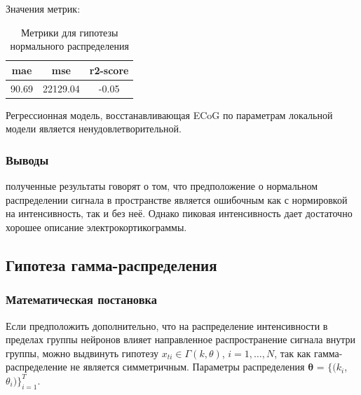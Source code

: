 \documentclass{mipt-thesis-bs}
\begin{document}
Значения метрик:
\begin{table}[h]
  
  \centering
    \begin{tabular}{ | c | c | c | }
	\hline
	mae & mse & r2-score \\ \hline
	90.69 & 22129.04 & -0.05 \\

	\hline
	\end{tabular}
\caption{Метрики для гипотезы нормального распределения}
\label{table:gauss mae}
\end{table}

Регрессионная модель, восстанавливающая ECoG по параметрам локальной модели является ненудовлетворительной.
\subsubsection{Выводы}
полученные результаты говорят о том, что предположение о нормальном распределении сигнала в пространстве является ошибочным как с нормировкой на интенсивность, так и без неё. Однако пиковая интенсивность дает достаточно хорошее описание электрокортикограммы. 
\subsection{Гипотеза гамма-распределения}

\subsubsection{Математическая постановка} 
Если предположить дополнительно, что на распределение интенсивности в пределах группы нейронов влияет направленное распространение сигнала внутри группы, можно выдвинуть гипотезу $x_{ti}
\in \Gamma(k, \theta)$, $i=1,\dots,N$, так как гамма-распределение не является симметричным. Параметры распределения $\mathbf{\theta}$ = $\{(k_i$, $\theta_i)\}_{i=1}^T$. 
\end{document}
